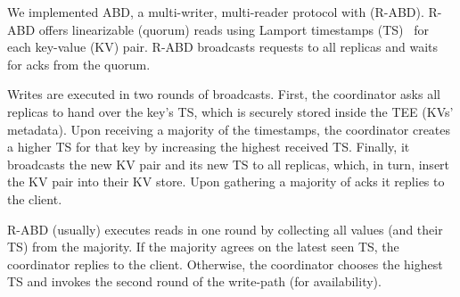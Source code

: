  We implemented ABD, a multi-writer, multi-reader protocol with \projecttitle{} (R-ABD). R-ABD offers linearizable (quorum) reads using Lamport timestamps (TS)~\cite{Lamport:1982} for each key-value (KV) pair. R-ABD broadcasts requests to all replicas and waits for acks from the quorum. %



Writes are executed in two rounds of broadcasts. First, the coordinator asks all replicas to hand over the key's TS, which is securely stored inside the TEE (KVs' metadata). Upon receiving a majority of the timestamps, the coordinator creates a higher TS for that key by increasing the highest received TS. Finally, it broadcasts the new KV pair and its new TS to all replicas, which, in turn, insert the KV pair into their KV store. Upon gathering a majority of
acks it replies to the client.


R-ABD (usually) executes reads in one round by collecting all values (and their TS) from the majority. If the majority agrees on the latest seen TS, the coordinator replies to the client. Otherwise, the coordinator chooses the highest TS and invokes the second round of the write-path (for availability).%


